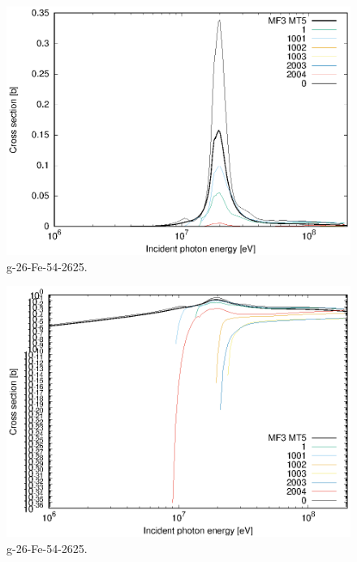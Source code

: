 \begin{figure}
 \includegraphics[width=\linewidth]{eps/g_26-Fe-54_2625.eps}
  \caption{g-26-Fe-54-2625.}
\end{figure}
\begin{figure}
 \includegraphics[width=\linewidth]{eps-log/g_26-Fe-54_2625.eps}
 \caption{g-26-Fe-54-2625.}
\end{figure}
\newpage \clearpage

